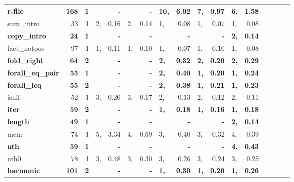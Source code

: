 \begin{table*}
\begin{center}
\begin{tabular}{|l|r|r|p{0pt}r|p{0pt}r|p{0pt}r|p{0pt}r|p{0pt}r|p{0pt}r|p{0pt}r|}
\bf r-file            & \bf   168& \bf  1& \bf    & \bf       -  & \bf    & \bf       -  & \bf 10,& \bf    6.92  & \bf  7,& \bf    0.97  & \bf  6,& \bf    1.58  \\
\hline
sum\_intro        &   33 & 1 &  2,&    0.16  &  2,&    0.14  &  1,&    0.08  &  1,&    0.07  &  1,&    0.08  \\
\bf copy\_intro       & \bf   24 & \bf 1 & \bf    & \bf       -  & \bf    & \bf       -  & \bf    & \bf       -  & \bf    & \bf       -  & \bf  2,& \bf    0.14  \\
fact\_notpos      &   97 & 1 &  1,&    0.11  &  1,&    0.10  &  1,&    0.07  &  1,&    0.10  &  1,&    0.08  \\
\bf fold\_right       & \bf   64 & \bf 2 & \bf    & \bf       -  & \bf    & \bf       -  & \bf  2,& \bf    0.32  & \bf  2,& \bf    0.20  & \bf  2,& \bf    0.29  \\
\bf forall\_eq\_pair  & \bf   55 & \bf 1 & \bf    & \bf       -  & \bf    & \bf       -  & \bf  2,& \bf    0.40  & \bf  1,& \bf    0.20  & \bf  1,& \bf    0.24  \\
\bf forall\_leq       & \bf   55 & \bf 2 & \bf    & \bf       -  & \bf    & \bf       -  & \bf  2,& \bf    0.38  & \bf  1,& \bf    0.21  & \bf  1,& \bf    0.23  \\
isnil             &   52 & 1 &  3,&    0.20  &  3,&    0.17  &  2,&    0.13  &  2,&    0.12  &  2,&    0.11  \\
\bf iter              & \bf   59 & \bf 2 & \bf    & \bf       -  & \bf    & \bf       -  & \bf  1,& \bf    0.18  & \bf  1,& \bf    0.16  & \bf  1,& \bf    0.18  \\
\bf length            & \bf   49 & \bf 1 & \bf    & \bf       -  & \bf    & \bf       -  & \bf    & \bf       -  & \bf    & \bf       -  & \bf  2,& \bf    0.14  \\
mem               &   74 & 1 &  5,&    3.34  &  4,&    0.69  &  3,&    0.40  &  3,&    0.32  &  4,&    0.39  \\
\bf nth               & \bf   59 & \bf 1 & \bf    & \bf       -  & \bf    & \bf       -  & \bf    & \bf       -  & \bf    & \bf       -  & \bf  4,& \bf    0.43  \\
nth0              &   78 & 1 &  3,&    0.48  &  3,&    0.30  &  3,&    0.26  &  3,&    0.24  &  3,&    0.25  \\
\bf harmonic          & \bf  101 & \bf 2 & \bf    & \bf       -  & \bf    & \bf       -  & \bf  1,& \bf    0.30  & \bf  1,& \bf    0.20  & \bf  1,& \bf    0.26  \\

\end{tabular}
\end{center}
\end{table*}
